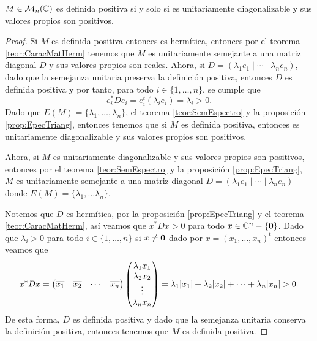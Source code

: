 \begin{teor}
  $M \in \mathcal{M}_n(\mathbb{C})$ es definida positiva si y solo si es unitariamente diagonalizable y sus valores propios son positivos.
\end{teor}
\begin{proof}
  Si $M$ es definida positiva entonces es hermítica, entonces por el teorema \ref{teor:CaracMatHerm} tenemos que $M$ es unitariamente semejante a una matriz diagonal $D$ y sus valores propios son reales. Ahora, si $D = (\lambda_1 e_1 \mid \cdots \mid  \lambda_n e_n)$, dado que la semejanza unitaria preserva la definición positiva, entonces $D$ es definida positiva y por tanto, para todo $i\in\{1,\ldots,n\}$, se cumple que
    \[
      e_i^* D e_i = e_i^t (\lambda_i e_i) = \lambda_i > 0.
    \]
  Dado que $E(M) = \{\lambda_1,\ldots,\lambda_n\}$, el teorema \ref{teor:SemEspectro} y la proposición \ref{prop:EpecTriang}, entonces tenemos que si $M$ es definida positiva, entonces es unitariamente diagonalizable y sus valores propios son positivos.

  Ahora, si $M$ es unitariamente diagonalizable y sus valores propios son positivos, entonces por el teorema \ref{teor:SemEspectro} y la proposición \ref{prop:EpecTriang}, $M$ es unitariamente semejante a una matriz diagonal $D = (\lambda_1 e_1 \mid \cdots \mid  \lambda_n e_n)$ donde $E(M) = \{\lambda_1, \ldots \lambda_n\}$.

  Notemos que $D$ es hermítica, por la proposición \ref{prop:EpecTriang} y el teorema \ref{teor:CaracMatHerm}, así veamos que $x^* D x > 0$ para todo $x \in \mathbb{C}^n - \{\mathbf{0}\}$. Dado que $\lambda_i > 0$ para todo $i \in \{1,\ldots,n\}$ si $x \neq \mathbf{0}$ dado por $x = (x_1, \ldots, x_n)^t$ entonces veamos que
  \[
    x^* D x 
      = \begin{pmatrix} \overline{x_1} & \overline{x_2} & \cdots & \overline{x_n} \end{pmatrix} 
        \begin{pmatrix} \lambda_1 x_1 \\ \lambda_2 x_2 \\ \vdots \\ \lambda_n x_n \end{pmatrix}
      = \lambda_1 \mathopen|x_1\mathclose| + \lambda_2 \mathopen|x_2\mathclose| + \cdots + \lambda_n \mathopen|x_n\mathclose| > 0.
  \]
  De esta forma, $D$ es definida positiva y dado que la semejanza unitaria conserva la definición positiva, entonces tenemos que $M$ es definida positiva.
\end{proof}